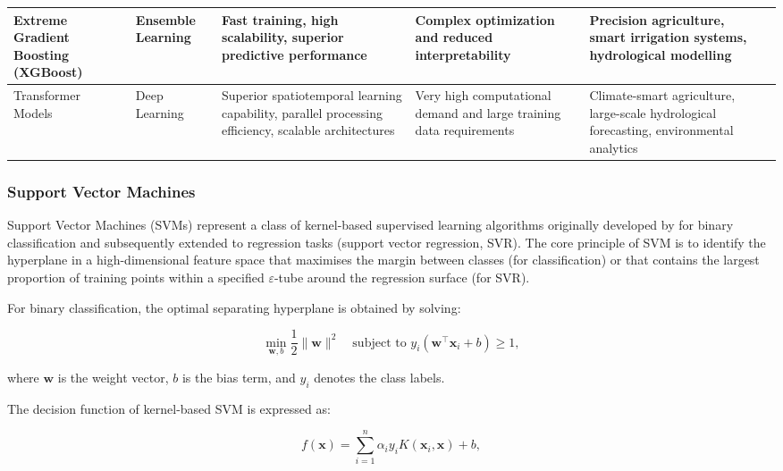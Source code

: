 \documentclass[land,article,submit,pdftex,moreauthors]{Definitions/mdpi}
\numberwithin{equation}{section}
\begin{document}
\begin{longtable}{p{1.4cm} p{1.3cm} p{2.6cm} p{2.6cm} p{2.6cm} p{2.3cm}}
Extreme Gradient Boosting (XGBoost) &
Ensemble Learning &
Fast training, high scalability, superior predictive performance &
Complex optimization and reduced interpretability &
Precision agriculture, smart irrigation systems, hydrological modelling &
\citep{Chen2016, Fan2018, Zamani2024, Zhang2025_XGB, Liang2026} \\ \hline

Transformer Models &
Deep Learning &
Superior spatiotemporal learning capability, parallel processing efficiency, scalable architectures &
Very high computational demand and large training data requirements &
Climate-smart agriculture, large-scale hydrological forecasting, environmental analytics &
\citep{Vaswani2017, Devlin2018, Wu2021_Trans, Li2026_Trans, Wang2025_Trans} \\

\end{longtable}
\normalsize

\subsubsection{Support Vector Machines}

Support Vector Machines (SVMs) represent a class of kernel-based supervised learning algorithms originally developed by \citet{cortes1995support} for binary classification and subsequently extended to regression tasks (support vector regression, SVR). The core principle of SVM is to identify the hyperplane in a high-dimensional feature space that maximises the margin between classes (for classification) or that contains the largest proportion of training points within a specified $\varepsilon$-tube around the regression surface (for SVR).

For binary classification, the optimal separating hyperplane is obtained by solving:

\begin{equation}
\min_{\mathbf{w},b} \frac{1}{2}\|\mathbf{w}\|^2
\quad
\text{subject to }
y_i(\mathbf{w}^\top \mathbf{x}_i+b)\geq 1,
\end{equation}

where $\mathbf{w}$ is the weight vector, $b$ is the bias term, and $y_i$ denotes the class labels.

The decision function of kernel-based SVM is expressed as:

\begin{equation}
f(\mathbf{x})=\sum_{i=1}^{n}\alpha_i y_i K(\mathbf{x}_i,\mathbf{x})+b,
\end{equation}
\end{document}
